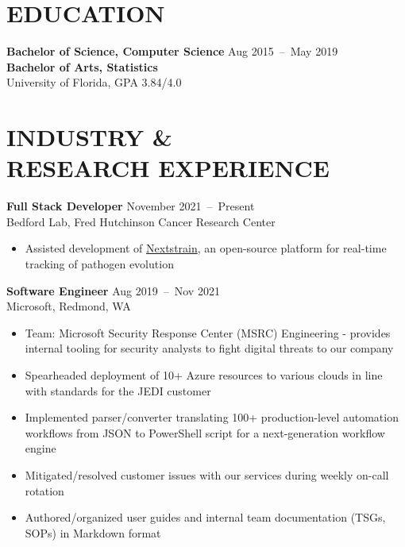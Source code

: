 \documentclass[line,resmargin]{res}
\begin{document}
\address{\href{mailto:victor@victorl.in}{victor@victorl.in} $|$
         \href{https://victorl.in/}{https://victorl.in/}}

\begin{resume}

\section{EDUCATION}
    \textbf{Bachelor of Science, Computer Science}    \hfill Aug 2015~--~May 2019 \\
    \textbf{Bachelor of Arts, Statistics} \\
    University of Florida, GPA 3.84/4.0

\section{INDUSTRY \& \\ RESEARCH EXPERIENCE}
    \textbf{Full Stack Developer}    \hfill November 2021~--~Present \\
    Bedford Lab, Fred Hutchinson Cancer Research Center
    \begin{itemize}  \itemsep -2pt
        \item Assisted development of \href{https://nextstrain.org/}{Nextstrain}, an open-source platform for real-time tracking of pathogen evolution
    \end{itemize}

    \textbf{Software Engineer}    \hfill Aug 2019~--~Nov 2021 \\
    Microsoft, Redmond, WA
    \begin{itemize}  \itemsep -2pt
        \item Team: Microsoft Security Response Center (MSRC) Engineering - provides internal tooling for security analysts to fight digital threats to our company
        \item Spearheaded deployment of 10+ Azure resources to various clouds in line with standards for the JEDI customer
        \item Implemented parser/converter translating 100+ production-level automation workflows from JSON to PowerShell script for a next-generation workflow engine
        \item Mitigated/resolved customer issues with our services during weekly on-call rotation
        \item Authored/organized user guides and internal team documentation (TSGs, SOPs) in Markdown format
    \end{itemize}


\end{resume}
\end{document}

